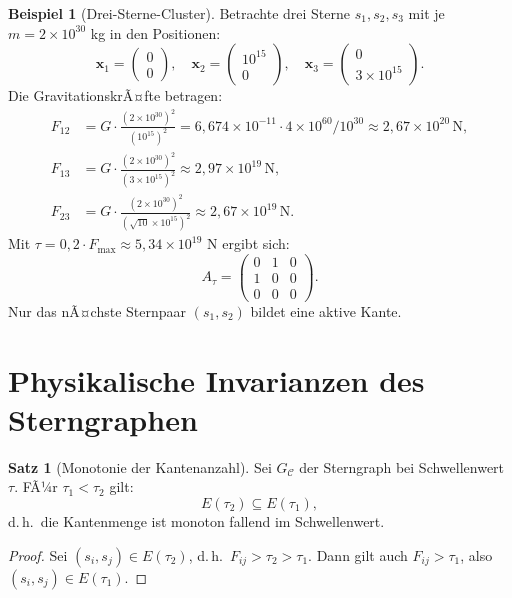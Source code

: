 ﻿\documentclass[a4paper,12pt]{report}
\theoremstyle{definition}
\newtheorem{beispiel}{Beispiel}
\newtheorem{satz}{Satz}
\begin{document}
\begin{beispiel}[Drei-Sterne-Cluster]
Betrachte drei Sterne $s_1, s_2, s_3$ mit je $m = 2 \times 10^{30}$ kg in den Positionen:
\[
\mathbf{x}_1 = \begin{pmatrix}0\\0\end{pmatrix}, \quad
\mathbf{x}_2 = \begin{pmatrix}10^{15}\\0\end{pmatrix}, \quad
\mathbf{x}_3 = \begin{pmatrix}0\\3 \times 10^{15}\end{pmatrix}.
\]
Die GravitationskrÃ¤fte betragen:
\begin{align*}
F_{12} &= G \cdot \frac{(2 \times 10^{30})^2}{(10^{15})^2} = 6{,}674 \times 10^{-11} \cdot 4 \times 10^{60} / 10^{30} \approx 2{,}67 \times 10^{20} \, \mathrm{N}, \\
F_{13} &= G \cdot \frac{(2 \times 10^{30})^2}{(3 \times 10^{15})^2} \approx 2{,}97 \times 10^{19} \, \mathrm{N}, \\
F_{23} &= G \cdot \frac{(2 \times 10^{30})^2}{(\sqrt{10} \times 10^{15})^2} \approx 2{,}67 \times 10^{19} \, \mathrm{N}.
\end{align*}
Mit $\tau = 0{,}2 \cdot F_\mathrm{max} \approx 5{,}34 \times 10^{19}$ N ergibt sich:
\[
A_\tau = \begin{pmatrix}
    0 & 1 & 0 \\
    1 & 0 & 0 \\
    0 & 0 & 0
\end{pmatrix}.
\]
Nur das nÃ¤chste Sternpaar $(s_1, s_2)$ bildet eine aktive Kante.
\end{beispiel}

\section{Physikalische Invarianzen des Sterngraphen}

\begin{satz}[Monotonie der Kantenanzahl]
\label{satz:monotonie}
Sei $G_\mathcal{C}$ der Sterngraph bei Schwellenwert $\tau$. FÃ¼r $\tau_1 < \tau_2$ gilt:
\[
E(\tau_2) \subseteq E(\tau_1),
\]
d.\,h.\ die Kantenmenge ist monoton fallend im Schwellenwert.
\end{satz}

\begin{proof}
Sei $(s_i, s_j) \in E(\tau_2)$, d.\,h.\ $F_{ij} > \tau_2 > \tau_1$. Dann gilt auch $F_{ij} > \tau_1$, also $(s_i, s_j) \in E(\tau_1)$.
\end{proof}
\end{document}

